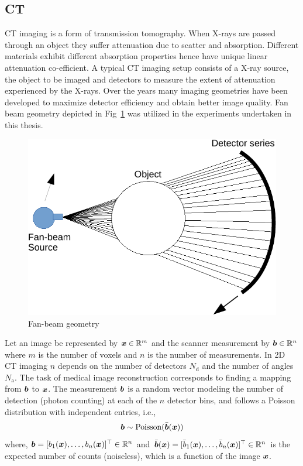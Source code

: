 \subsection{CT}

\ac{CT} imaging is a form of transmission tomography. When X-rays are passed through an object they suffer attenuation due to scatter and absorption. Different materials exhibit different absorption properties hence have unique linear attenuation co-efficient. A typical \ac{CT} imaging setup consists of a X-ray source, the object to be imaged and detectors to measure the extent of attenuation experienced by the X-rays. Over the years many imaging geometries have been developed to maximize detector efficiency and obtain better image quality. Fan beam geometry depicted in Fig~\ref{fig:xgeo} was utilized in the experiments undertaken in this thesis. 

\begin{figure}[!htbp]
	\centering
	\includegraphics[width=0.7\linewidth]{./Figures/x_ray_geo-crop.pdf}
	\caption{Fan-beam geometry }
	\label{fig:xgeo}
\end{figure}


Let an image be represented by $\bm{x} \in \mathbb{R}^m$ and the scanner measurement by $\bm{b} \in \mathbb{R}^n$ where $m$ is the number of voxels and $n$ is the number of measurements. In \ac{2D} \ac{CT} imaging $n$ depends on the number of detectors $N_\mathrm{d}$ and the number of angles $N_\mathrm{a}$. The task of medical image reconstruction corresponds to finding a mapping from $\bm{b}$ to $\bm{x}$. The measurement $\bm{b}$ is a random vector modeling the number of detection (photon counting) at each of the $n$ detector bins, and follows a Poisson distribution with independent entries, i.e.,
\begin{equation}\label{eq:pCT}
\bm{b} \sim \mathrm{Poisson}(\bar{\bm{b}}(\bm{x}))
\end{equation}    
where, $\bm{b}  =  [b_1(\bm{x}),\dots,b_n(\bm{x})]^\top\in \mathbb{R}^n$ and $\bar{\bm{b}}(\bm{x})  =  [\bar{b}_1(\bm{x}),\dots,\bar{b}_n(\bm{x})]^\top\in \mathbb{R}^n$ is the expected number of counts (noiseless), which is a function of the image $\bm{x}$. 

